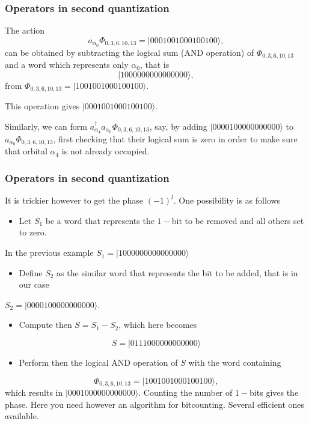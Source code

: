 \documentclass{beamer}
\begin{document}
\begin{frame}
\frametitle{Operators in second quantization}

\begin{block}{}
The action
\[
a_{\alpha_0}\Phi_{0,3,6,10,13} = |0001001000100100\rangle,
\]
can be obtained by subtracting the logical sum (AND operation) of $\Phi_{0,3,6,10,13}$ and 
a word which represents only $\alpha_0$, that is
\[
|1000000000000000\rangle,
\] 
from $\Phi_{0,3,6,10,13}= |1001001000100100\rangle$.

This operation gives $|0001001000100100\rangle$. 

Similarly, we can form $a^{\dagger}_{\alpha_4}a_{\alpha_0}\Phi_{0,3,6,10,13}$, say, by adding 
$|0000100000000000\rangle$ to $a_{\alpha_0}\Phi_{0,3,6,10,13}$, first checking that their logical sum
is zero in order to make sure that orbital $\alpha_4$ is not already occupied. 
\end{block}
\end{frame}

\begin{frame}
\frametitle{Operators in second quantization}

\begin{block}{}
It is trickier however to get the phase $(-1)^l$. 
One possibility is as follows
\begin{itemize}
\item Let $S_1$ be a word that represents the $1-$bit to be removed and all others set to zero.
\end{itemize}

\noindent
In the previous example $S_1=|1000000000000000\rangle$
\begin{itemize}
\item Define $S_2$ as the similar word that represents the bit to be added, that is in our case
\end{itemize}

\noindent
$S_2=|0000100000000000\rangle$.
\begin{itemize}
\item Compute then $S=S_1-S_2$, which here becomes
\end{itemize}

\noindent
\[
S=|0111000000000000\rangle
\]
\begin{itemize}
\item Perform then the logical AND operation of $S$ with the word containing 
\end{itemize}

\noindent
\[
\Phi_{0,3,6,10,13} = |1001001000100100\rangle,
\]
which results in $|0001000000000000\rangle$. Counting the number of $1-$bits gives the phase.  Here you need however an algorithm for bitcounting. Several efficient ones available. 
\end{block}
\end{frame}
\end{document}
